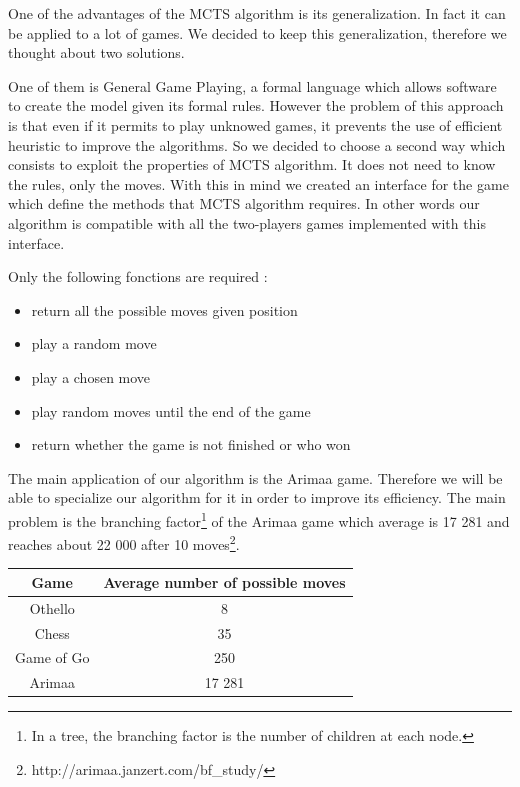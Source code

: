 One of the advantages of the MCTS algorithm is its generalization. In fact it can be applied to a lot of games. We decided to keep this generalization, therefore we thought about two solutions.

One of them is General Game Playing, a formal language which allows software to create the model given its formal rules. However the problem of this approach is that even if it permits to play unknowed games, it prevents the use of efficient heuristic to improve the algorithms.
So we decided to choose a second way which consists to exploit the properties of MCTS algorithm. 
It does not need to know the rules, only the moves. With this in mind we created an interface for the game which define the methods that MCTS algorithm requires. In other words our algorithm is compatible with all the two-players games implemented with this interface.

Only the following fonctions are required : 
\begin{itemize}
\item return all the possible moves given position
\item play a random move
\item play a chosen move 
\item play random moves until the end of the game
\item return whether the game is not finished or who won
\end{itemize}

The main application of our algorithm is the Arimaa game. Therefore we will be able to specialize our algorithm for it in order to improve its efficiency. The main problem is the branching factor\footnote{In a tree, the branching factor is the number of children at each node.} of the Arimaa game which average is 17 281 and reaches about 22 000 after 10 moves\footnote{http://arimaa.janzert.com/bf\_study/}.\\

\begin{center}
	\begin{tabular}{ | c | c |}
		\hline Game & Average number of possible moves \\ \hline
		\hline  
		Othello & 8\\
		\hline  
		Chess & 35\\
		\hline  
		Game of Go & 250\\
		\hline
		Arimaa & 17 281\\
		\hline
	\end{tabular}
\end{center}

